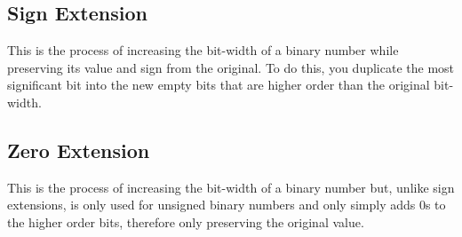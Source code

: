 \subsection{Sign Extension}
\qquad
This is the process of increasing the bit-width of a binary number while preserving its value and sign from the original. To do this, you duplicate the most significant bit into the new empty bits that are higher order than the original bit-width.

\subsection{Zero Extension}
\qquad
This is the process of increasing the bit-width of a binary number but, unlike sign extensions, is only used for unsigned binary numbers and only simply adds 0s to the higher order bits, therefore only preserving the original value.



